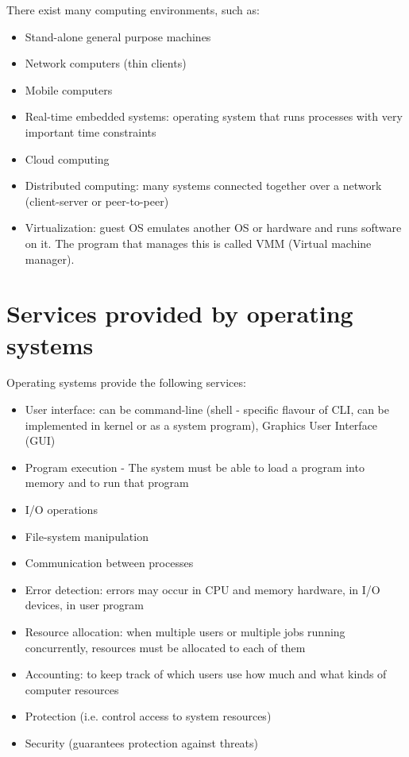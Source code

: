 There exist many computing environments, such as:
\begin{itemize}
  \item Stand-alone general purpose machines
  \item Network computers (thin clients)
  \item Mobile computers
  \item Real-time embedded systems: operating system that runs processes with
  very important time constraints
  \item Cloud computing
  \item Distributed computing: many systems connected together over a network (client-server or peer-to-peer)
  \item Virtualization: guest OS emulates another OS or hardware and runs
  software on it. The program that manages this is called VMM (Virtual machine
  manager).
\end{itemize}

\section{Services provided by operating systems}

Operating systems provide the following services:
\begin{itemize}
  \item User interface: can be command-line (shell - specific flavour of CLI, can be implemented in kernel or as a system program), Graphics User Interface
  (GUI)
  \item Program execution - The system must be able to load a program into
  memory and to run that program
  \item I/O operations
  \item File-system manipulation
  \item Communication between processes
  \item Error detection: errors may occur in CPU and memory hardware, in I/O
  devices, in user program
  \item Resource allocation: when multiple users or multiple jobs running
  concurrently, resources must be allocated to each of them
  \item Accounting: to keep track of which users use how much and what kinds
  of computer resources
  \item Protection (i.e. control access to system resources)
  \item Security (guarantees protection against threats)
\end{itemize}

